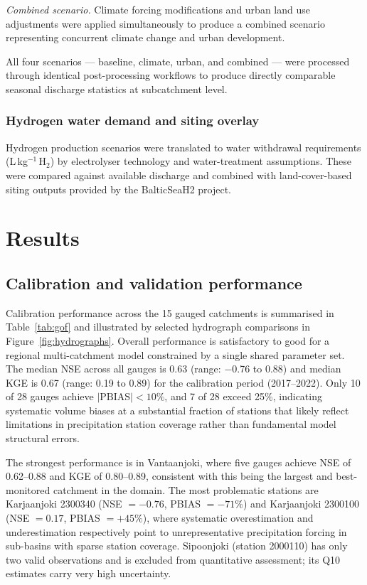 \documentclass[draft]{agujournal2019}
\begin{document}
\textit{Combined scenario.} Climate forcing modifications and urban land use adjustments were applied simultaneously to produce a combined scenario representing concurrent climate change and urban development.

All four scenarios — baseline, climate, urban, and combined — were processed through identical post-processing workflows to produce directly comparable seasonal discharge statistics at subcatchment level.

\subsubsection{Hydrogen water demand and siting overlay}
Hydrogen production scenarios were translated to water withdrawal requirements (L\,kg$^{-1}$\,H$_2$) by electrolyser technology and water-treatment assumptions. These were compared against available discharge and combined with land-cover-based siting outputs provided by the BalticSeaH2 project.

\section{Results}

\subsection{Calibration and validation performance}

Calibration performance across the 15 gauged catchments is summarised in Table~\ref{tab:gof} and illustrated by selected hydrograph comparisons in Figure~\ref{fig:hydrographs}. Overall performance is satisfactory to good for a regional multi-catchment model constrained by a single shared parameter set. The median NSE across all gauges is 0.63 (range: $-$0.76 to 0.88) and median KGE is 0.67 (range: 0.19 to 0.89) for the calibration period (2017--2022). Only 10 of 28 gauges achieve $|\mathrm{PBIAS}| < 10\%$, and 7 of 28 exceed 25\%, indicating systematic volume biases at a substantial fraction of stations that likely reflect limitations in precipitation station coverage rather than fundamental model structural errors.

The strongest performance is in Vantaanjoki, where five gauges achieve NSE of 0.62--0.88 and KGE of 0.80--0.89, consistent with this being the largest and best-monitored catchment in the domain. The most problematic stations are Karjaanjoki 2300340 (NSE $= -0.76$, PBIAS $= -71\%$) and Karjaanjoki 2300100 (NSE $= 0.17$, PBIAS $= +45\%$), where systematic overestimation and underestimation respectively point to unrepresentative precipitation forcing in sub-basins with sparse station coverage. Sipoonjoki (station 2000110) has only two valid observations and is excluded from quantitative assessment; its Q10 estimates carry very high uncertainty.
\end{document}
